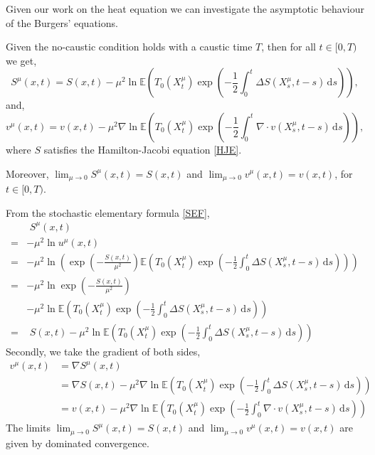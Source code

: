 \documentclass[a4paper,12pt,draft]{report}
\begin{document}
Given our work on the heat equation we can investigate the asymptotic behaviour of the Burgers' equations.
\corollary
{
Given the no-caustic condition holds with a caustic time $T$, then for all $t \in [0, T)$ we get,
$$
S^\mu(x, t) = S(x, t) - \mu^2\ln\mathbb{E}\left(T_{0}(X^{\mu}_{t})\exp\left(-\frac{1}{2}\int_0^t \Delta S(X^{\mu}_{s}, t - s) \,\mathrm{d}s\right)\right),
$$
and,
$$
v^\mu(x, t) = v(x, t) - \mu^2\nabla\ln\mathbb{E}\left(T_{0}(X^{\mu}_{t})\exp\left(-\frac{1}{2}\int_0^t \nabla \cdot v(X^{\mu}_{s}, t - s)\,\mathrm{d}s\right)\right),
$$
where $S$ satisfies the Hamilton-Jacobi equation \eqref{HJE}.

Moreover, $\lim_{\mu \to 0}S^\mu(x, t) = S(x, t)$ and $\lim_{\mu \to 0}v^\mu(x, t) = v(x, t)$, for $t \in [0, T)$.
}
\proof
{
From the stochastic elementary formula \eqref{SEF},
\begin{align}
& \,\,S^\mu(x, t)\nonumber\\
= & -\mu^2\ln u^\mu(x, t)\nonumber\\
= & -\mu^2\ln\left(\exp\left(-\frac{S(x, t)}{\mu^2}\right)\mathbb{E}\left(T_{0}(X^{\mu}_{t})\exp\left(-\frac{1}{2}\int_0^t \Delta S(X^{\mu}_{s}, t - s)\,\mathrm{d}s\right)\right)\right)\nonumber\\
= & -\mu^2\ln\exp\left(-\frac{S(x, t)}{\mu^2}\right)\nonumber\\
& - \mu^2\ln\mathbb{E}\left(T_{0}(X^{\mu}_{t})\exp\left(-\frac{1}{2}\int_0^t \Delta S(X^{\mu}_{s}, t - s) \,\mathrm{d}s\right)\right)\nonumber\\
= & \,\,S(x, t) - \mu^2\ln\mathbb{E}\left(T_{0}(X^{\mu}_{t})\exp\left(-\frac{1}{2}\int_0^t \Delta S(X^{\mu}_{s}, t - s) \,\mathrm{d}s\right)\right)\nonumber
\end{align}
Secondly, we take the gradient of both sides,
\begin{align}
v^\mu(x, t) & = \nabla S^\mu(x, t)\nonumber\\
& = \nabla S(x, t) - \mu^2\nabla\ln\mathbb{E}\left(T_{0}(X^{\mu}_{t})\exp\left(-\frac{1}{2}\int_0^t \Delta S(X^{\mu}_{s}, t - s)\,\mathrm{d}s\right)\right)\nonumber\\
& = v(x, t) - \mu^2\nabla\ln\mathbb{E}\left(T_{0}(X^{\mu}_{t})\exp\left(-\frac{1}{2}\int_0^t \nabla \cdot v(X^{\mu}_{s}, t - s)\,\mathrm{d}s\right)\right)\nonumber
\end{align}
The limits $\lim_{\mu \to 0}S^\mu(x, t) = S(x, t)$ and $\lim_{\mu \to 0}v^\mu(x, t) = v(x, t)$ are given by dominated convergence.

\qedhere
}
\end{document}

